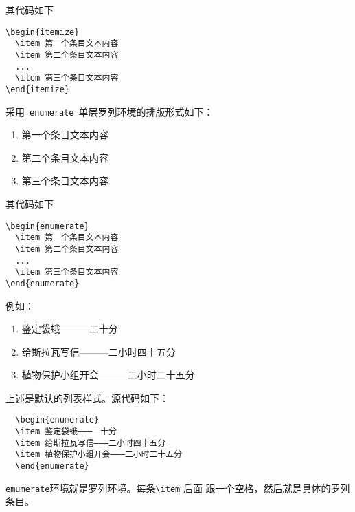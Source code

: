 其代码如下
\begin{verbatim}
\begin{itemize}
  \item 第一个条目文本内容
  \item 第二个条目文本内容
  ...
  \item 第三个条目文本内容
\end{itemize}
\end{verbatim}

采用~\verb|enumerate|~单层罗列环境的排版形式如下：
\begin{enumerate}
\item 第一个条目文本内容
\item 第二个条目文本内容
\item 第三个条目文本内容
\end{enumerate}

其代码如下
\begin{verbatim}
\begin{enumerate}
  \item 第一个条目文本内容
  \item 第二个条目文本内容
  ...
  \item 第三个条目文本内容
\end{enumerate}
\end{verbatim}

例如：

\begin{enumerate}
\item 鉴定袋蛾———二十分
\item 给斯拉瓦写信———二小时四十五分
\item 植物保护小组开会———二小时二十五分
\end{enumerate}

上述是默认的列表样式。源代码如下：
\begin{lstlisting}
  \begin{enumerate}
  \item 鉴定袋蛾———二十分
  \item 给斯拉瓦写信———二小时四十五分
  \item 植物保护小组开会———二小时二十五分
  \end{enumerate}
\end{lstlisting}

\texttt{emumerate}环境就是罗列环境。每条\verb|\item| 后面
跟一个空格，然后就是具体的罗列条目。

